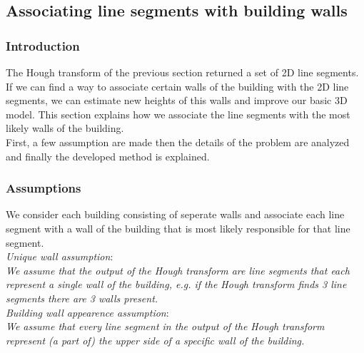 \documentclass[10pt]{article}
\begin{document}
\subsection{Associating line segments with building walls}
%


% 

	\subsubsection{Introduction}
	The Hough transform of the previous section returned a set of 2D line
	segments.  If we can find a way to associate certain walls of the building with
	the 2D line segments, we can estimate new heights of this walls and improve our basic 3D model.
	This section explains how we associate the line segments with the most
	likely walls of the building. \\
	First, a few assumption are made then the details of the problem are analyzed and finally the developed method is explained.

	\subsubsection{Assumptions}
	We consider each building consisting of seperate walls and associate each
	line segment with a wall of the building that is most likely responsible for
	that line segment. \\
		
	\emph{Unique wall assumption}:\\
	\emph{We assume that the output of the Hough transform are line segments
	that each represent a single wall of the building, e.g. if the Hough
	transform finds 3 line segments there are 3 walls present.}\\

	\emph{Building wall appearence assumption}:\\
	\emph{We assume that every line segment in the output of the Hough transform represent (a part of) the upper side of
	a specific wall of the building.}
\end{document}
